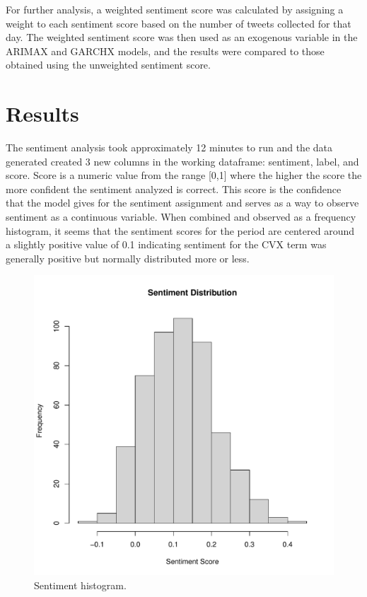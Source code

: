 \documentclass[12pt, letterpaper, titlepage]{article}
\begin{document}
For further analysis, a weighted sentiment score was calculated by assigning a weight to each sentiment score based on the number of tweets collected for that day. The weighted sentiment score was then used as an exogenous variable in the ARIMAX and GARCHX models, and the results were compared to those obtained using the unweighted sentiment score.

\section{Results}
\label{sec:results}

The sentiment analysis took approximately 12 minutes to run and the data generated created 3 new columns in the working dataframe: sentiment, label, and score. Score is a numeric value from the range [0,1] where the higher the score the more confident the sentiment analyzed is correct. This score is the confidence that the model gives for the sentiment assignment and serves as a way to observe sentiment as a continuous variable. When combined and observed as a frequency histogram, it seems that the sentiment scores for the period are centered around a slightly positive value of 0.1 indicating sentiment for the CVX term was generally positive but normally distributed more or less.


\begin{figure}[tbp]
  \begin{center}
  \includegraphics[width=\textwidth]{../figures/fig3.pdf}
  \caption{Sentiment histogram.}\label{fig:sentimenthist}
  \end{center}
\end{figure}
\end{document}
